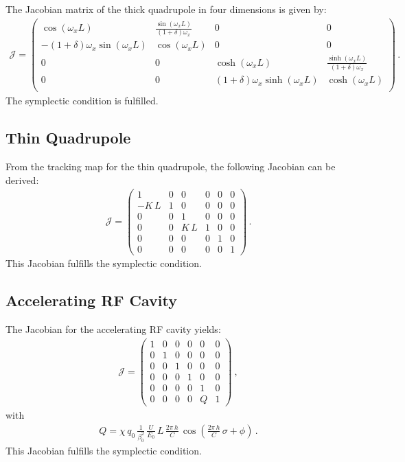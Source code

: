 \begin{appendices}
The Jacobian matrix of the thick quadrupole in four dimensions is given by:
%
\begin{align}
  \mathcal{J} = 
\left(
\begin{array}{cccc}
 \cos ( \omega_x L ) &  \frac{\sin (\omega_x L)}{(1+\delta) \omega_x } & 0 & 0 \\
 -(1+ \delta) \omega_x  \sin (\omega_x L) & \cos (\omega_x L) & 0 & 0 \\
 0 & 0 & \cosh (\omega_x L) & \frac{\sinh (\omega_x L)}{(1+\delta) \omega_x } \\
 0 & 0 & (1+\delta) \omega_x  \sinh (\omega_x L) & \cosh (\omega_x L) \\
\end{array}
\right) \, .
\end{align}
The symplectic condition is fulfilled.


 
\subsection{Thin Quadrupole}

From the tracking map for the thin quadrupole, the following Jacobian can be derived:
\begin{align}
  \mathcal{J} = 
\begin{pmatrix} 1 & 0 & 0 & 0 & 0 & 0 \\ -K \, L & 1 & 0 & 0 & 0 & 0 \\ 0 & 0 & 1 & 0 & 0 & 0 \\ 0 & 0 & K \, L & 1 & 0 & 0 \\ 0 & 0 & 0 & 0 & 1 & 0 \\ 0 & 0 & 0 & 0 & 0 & 1   \end{pmatrix} \, .
\end{align}
This Jacobian fulfills the symplectic condition. 

\subsection{Accelerating RF Cavity}

The Jacobian for the accelerating RF cavity yields:
\begin{align}
  \mathcal{J} = 
\begin{pmatrix} 1 & 0 & 0 & 0 & 0 & 0 \\ 0 & 1 & 0 & 0 & 0 & 0 \\ 0 & 0 & 1 & 0 & 0 & 0 \\ 0 & 0 & 0 & 1 & 0 & 0 \\ 0 & 0 & 0 & 0 & 1 & 0 \\ 0 & 0 & 0 & 0 & Q & 1   \end{pmatrix} \ , 
\end{align}
with 
\begin{align}
  Q = \chi \, q_0 \, \frac{1}{\beta_0^2} \, \frac{U}{E_0} \, L \, \frac{ 2 \pi \, h}{C} \, \cos \left( \frac{2 \pi \, h}{C} \, \sigma + \phi \right) \, .
\end{align}
This Jacobian fulfills the symplectic condition. 


\end{appendices}
